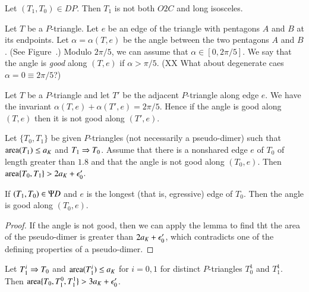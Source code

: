 \begin{lemma}
Let $(T_1,T_0)\in DP$.  Then $T_1$ is not both $O2C$  and long isosceles.
\end{lemma}

\begin{definition}  Let $T$ be a $P$-triangle.  Let $e$ be an edge of the triangle with pentagons
$A$ and $B$ at its endpoints.
Let $\alpha = \alpha(T,e)$ be the angle between the two pentagons $A$ and $B$.  (See Figure~.)  Modulo
$2\pi/5$, we can assume that $\alpha\in  [0,2\pi/5]$.  We say that the angle is {\it good} along $(T,e)$ if $\alpha>\pi/5$.
(XX What about degenerate caes $\alpha = 0 \equiv 2\pi/5$?)
\end{definition}

Let $T$ be a $P$-triangle and let $T'$ be the adjacent $P$-triangle along edge $e$.  
We have the invariant $\alpha(T,e)+\alpha(T',e)=2\pi/5$.
Hence if the angle is good along $(T,e)$ then it is not good along $(T',e)$.


\begin{lemma}
Let $\{T_0,T_1\}$ be given $P$-triangles (not necessarily a pseudo-dimer) such that ${\operatorname{area}}(T_1)\le a_K$ and $T_1\Rightarrow T_0$.
Assume that there is a nonshared edge $e$ of $T_0$ of length greater than $1.8$ and that the angle is not good along $(T_0,e)$.
Then ${\operatorname{area}}\{T_0,T_1\} > 2a_K + \epsilon_0'$.
\end{lemma}

\begin{corollary} If $(T_1,T_0)\in \Psi D$ and $e$ is the longest (that is, egressive) edge of $T_0$.  Then the angle
is good along $(T_0,e)$.
\end{corollary}

\begin{proof} If the angle is not good, then we can apply the lemma to find tht the area of the pseudo-dimer is
greater than $2a_K + \epsilon_0'$, which contradicts one of the defining properties of a pseudo-dimer.
\end{proof}


\begin{lemma}
Let $T_1^i\Rightarrow T_0$ and ${\operatorname{area}}(T_1^i)\le a_K$ for $i=0,1$ for distinct $P$-triangles $T^1_0$ and $T^1_1$.
Then ${\operatorname{area}}\{T_0,T^0_1,T^1_1\} > 3a_K + \epsilon_0'$.
\end{lemma}


